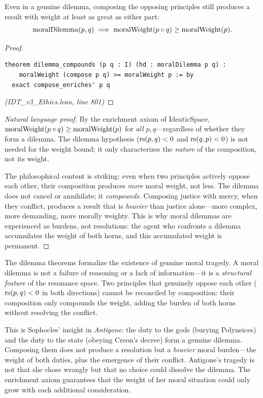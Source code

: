 \begin{theorem}
\label{thm:dilemma-compounds}
Even in a genuine dilemma, composing the opposing principles still produces
a result with weight at least as great as either part:
\[
  \mathrm{moralDilemma}(p, q) \implies
  \mathrm{moralWeight}(p \circ q) \geq \mathrm{moralWeight}(p).
\]
\end{theorem}

\begin{proof}
\begin{lstlisting}
theorem dilemma_compounds (p q : I) (hd : moralDilemma p q) :
    moralWeight (compose p q) >= moralWeight p := by
  exact compose_enriches' p q
\end{lstlisting}
\textit{(IDT\_v3\_Ethics.lean, line 801)}
\end{proof}

\begin{proof}[Natural language proof]
By the enrichment axiom of $\mathrm{IdeaticSpace}$,
$\mathrm{moralWeight}(p \circ q) \geq \mathrm{moralWeight}(p)$ for
\emph{all} $p, q$---regardless of whether they form a dilemma. The
dilemma hypothesis ($\mathrm{rs}(p,q) < 0$ and $\mathrm{rs}(q,p) < 0$) is not needed for
the weight bound; it only characterizes the \emph{nature} of the composition,
not its weight.

The philosophical content is striking: even when two principles actively
oppose each other, their composition produces \emph{more} moral weight,
not less. The dilemma does not cancel or annihilate; it \emph{compounds}.
Composing justice with mercy, when they conflict, produces a result that is
\emph{heavier} than justice alone---more complex, more demanding, more
morally weighty. This is why moral dilemmas are experienced as burdens, not
resolutions: the agent who confronts a dilemma accumulates the weight of
both horns, and this accumulated weight is permanent.
\end{proof}

\begin{interpretation}
The dilemma theorems formalize the existence of genuine moral tragedy.
A moral dilemma is not a failure of reasoning or a lack of information---it
is a \emph{structural feature} of the resonance space. Two principles that
genuinely oppose each other ($\mathrm{rs}(p,q) < 0$ in both directions) cannot be
reconciled by composition: their composition only compounds the weight,
adding the burden of both horns without resolving the conflict.

This is Sophocles' insight in \emph{Antigone}: the duty to the gods
(burying Polyneices) and the duty to the state (obeying Creon's decree)
form a genuine dilemma. Composing them does not produce a resolution but
a \emph{heavier} moral burden---the weight of both duties, plus the
emergence of their conflict. Antigone's tragedy is not that she chose
wrongly but that no choice could dissolve the dilemma. The enrichment
axiom guarantees that the weight of her moral situation could only grow
with each additional consideration.
\end{interpretation}


